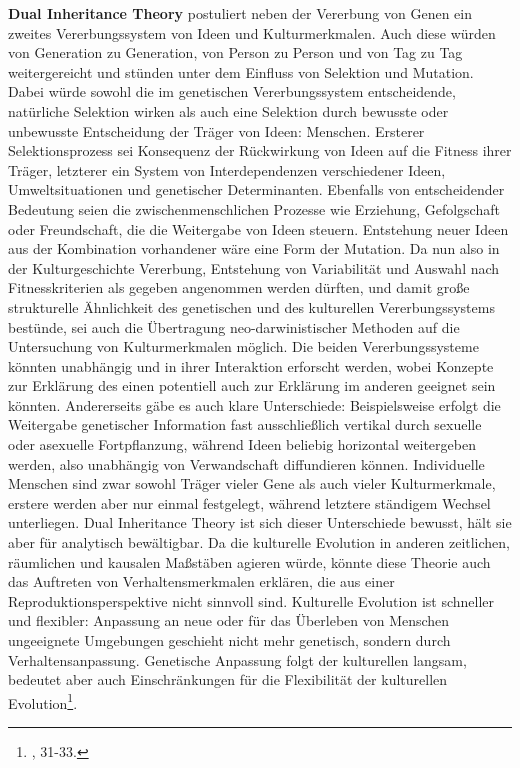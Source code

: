 \documentclass[openany,twoside,twocolumn]{book}
\let\rmarkdownfootnote\footnote%
\def\footnote{\protect\rmarkdownfootnote}
\begin{document}
\textbf{Dual Inheritance Theory} postuliert neben der Vererbung von
Genen ein zweites Vererbungssystem von Ideen und Kulturmerkmalen. Auch
diese würden von Generation zu Generation, von Person zu Person und von
Tag zu Tag weitergereicht und stünden unter dem Einfluss von Selektion
und Mutation. Dabei würde sowohl die im genetischen Vererbungssystem
entscheidende, natürliche Selektion wirken als auch eine Selektion durch
bewusste oder unbewusste Entscheidung der Träger von Ideen: Menschen.
Ersterer Selektionsprozess sei Konsequenz der Rückwirkung von Ideen auf
die Fitness ihrer Träger, letzterer ein System von Interdependenzen
verschiedener Ideen, Umweltsituationen und genetischer Determinanten.
Ebenfalls von entscheidender Bedeutung seien die zwischenmenschlichen
Prozesse wie Erziehung, Gefolgschaft oder Freundschaft, die die
Weitergabe von Ideen steuern. Entstehung neuer Ideen aus der Kombination
vorhandener wäre eine Form der Mutation. Da nun also in der
Kulturgeschichte Vererbung, Entstehung von Variabilität und Auswahl nach
Fitnesskriterien als gegeben angenommen werden dürften, und damit große
strukturelle Ähnlichkeit des genetischen und des kulturellen
Vererbungssystems bestünde, sei auch die Übertragung neo-darwinistischer
Methoden auf die Untersuchung von Kulturmerkmalen möglich. Die beiden
Vererbungssysteme könnten unabhängig und in ihrer Interaktion erforscht
werden, wobei Konzepte zur Erklärung des einen potentiell auch zur
Erklärung im anderen geeignet sein könnten. Andererseits gäbe es auch
klare Unterschiede: Beispielsweise erfolgt die Weitergabe genetischer
Information fast ausschließlich vertikal durch sexuelle oder asexuelle
Fortpflanzung, während Ideen beliebig horizontal weitergeben werden,
also unabhängig von Verwandschaft diffundieren können. Individuelle
Menschen sind zwar sowohl Träger vieler Gene als auch vieler
Kulturmerkmale, erstere werden aber nur einmal festgelegt, während
letztere ständigem Wechsel unterliegen. Dual Inheritance Theory ist sich
dieser Unterschiede bewusst, hält sie aber für analytisch bewältigbar.
Da die kulturelle Evolution in anderen zeitlichen, räumlichen und
kausalen Maßstäben agieren würde, könnte diese Theorie auch das
Auftreten von Verhaltensmerkmalen erklären, die aus einer
Reproduktionsperspektive nicht sinnvoll sind. Kulturelle Evolution ist
schneller und flexibler: Anpassung an neue oder für das Überleben von
Menschen ungeeignete Umgebungen geschieht nicht mehr genetisch, sondern
durch Verhaltensanpassung. Genetische Anpassung folgt der kulturellen
langsam, bedeutet aber auch Einschränkungen für die Flexibilität der
kulturellen Evolution\footnote{\textcite{SmithThreestylesevolutionary2000},
  31-33.}.
\end{document}
